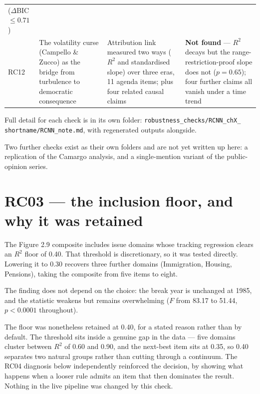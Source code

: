 \begin{threeparttable}
\begin{tabular}{p{1.1cm} p{3.5cm} p{4.3cm} p{3.6cm}}
($\Delta$BIC $\leq0.71$) \\
RC12 & The volatility curse (Campello \& Zucco) as the bridge from turbulence to democratic
consequence & Attribution link measured two ways ($R^2$ and standardised slope) over three eras,
11 agenda items; plus four related causal claims & \textbf{Not found} --- $R^2$ decays but the
range-restriction-proof slope does not ($p=0.65$); four further claims all vanish under a time
trend \\
\bottomrule
\end{tabular}
\begin{tablenotes}\footnotesize
\item Full detail for each check is in its own folder: \texttt{robustness\_checks/RCNN\_chX\_
shortname/RCNN\_note.md}, with regenerated outputs alongside.
\item Two further checks exist as their own folders and are not yet written up here: a replication
of the Camargo analysis, and a single-mention variant of the public-opinion series.
\end{tablenotes}
\end{threeparttable}

\section{RC03 --- the inclusion floor, and why it was retained}

The Figure 2.9 composite includes issue domains whose tracking regression clears an $R^2$ floor of
0.40. That threshold is discretionary, so it was tested directly. Lowering it to 0.30 recovers three
further domains (Immigration, Housing, Pensions), taking the composite from five items to eight.

The finding does not depend on the choice: the break year is unchanged at 1985, and the statistic
weakens but remains overwhelming ($F$ from 83.17 to 51.44, $p<0.0001$ throughout).

The floor was nonetheless retained at 0.40, for a stated reason rather than by default. The
threshold sits inside a genuine gap in the data --- five domains cluster between $R^2$ of 0.60 and
0.90, and the next-best item sits at 0.35, so 0.40 separates two natural groups rather than cutting
through a continuum. The RC04 diagnosis below independently reinforced the decision, by showing what
happens when a looser rule admits an item that then dominates the result. Nothing in the live
pipeline was changed by this check.

